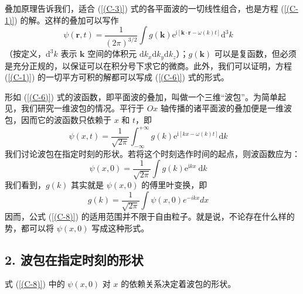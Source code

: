 叠加原理告诉我们，适合 (\ref{(C-3)}) 式的各平面波的一切线性组合，也是方程 (\ref{(C-1)}) 的解。这样的叠加可以写作
\begin{equation}
	\psi(\boldsymbol{r}, t)=\frac{1}{(2\pi)^{3 /2}}\int g(\boldsymbol{k})\mathrm{e}^{\mathrm{i}[\boldsymbol{k}\cdot\boldsymbol{r}-\omega(k) t]}\mathrm{d}^{3} k \quad \label{(C-6)}
\end{equation}
（按定义，$\mathrm{d}^{3}k$ 表示 $\boldsymbol{k}$ 空间的体积元 $\mathrm{d}k_x \mathrm{d}k_y \mathrm{d}k_z$）；$g(\boldsymbol{k})$ 可以是复函数，但必须是充分正规的，以保证可以在积分号下求它的微商。此外，我们可以证明，方程 (\ref{(C-1)}) 的一切平方可积的解都可以写成 (\ref{(C-6)}) 式的形式。

形如 (\ref{(C-6)}) 式的波函数，即平面波的叠加，叫做一个三维“波包”。为简单起见，我们研究一维波包的情况。平行于 $Ox$ 轴传播的诸平面波的叠加便是一维波包，因而它的波函数只依赖于 $x$ 和 $t$，即
\begin{equation}
	\psi (x, t)=\frac{1}{\sqrt{2 \pi}} \int_{-\infty}^{+\infty} g(k) \mathrm{e}^{\mathrm{i}[k x-\omega(k) t]} \mathrm{d} k \quad \label{(C-7)}
\end{equation}
我们讨论波包在指定时刻的形状。若将这个时刻选作时间的起点，则波函数应为：
\begin{equation}
	\psi (x, 0)=\frac{1}{\sqrt{2 \pi}} \int g(k) \mathrm{e}^{\mathrm{i} k x} \mathrm{~d} k \quad \label{(C-8)}
\end{equation}
我们看到，$g(k)$ 其实就是 $\psi (x, 0)$ 的傅里叶变换，即
\begin{equation}
	g(k)=\frac{1}{\sqrt{2\pi}}\int\psi(x, 0)e^{-ikx}dx \quad \label{(C-9)}
\end{equation}
因而，公式 (\ref{(C-8)}) 的适用范围并不限于自由粒子。就是说，不论存在什么样的势，都可以将 $\psi (x, 0)$ 写成这种形式。



\subsection*{2. 波包在指定时刻的形状}
式 (\ref{(C-8)}) 中的 $\psi (x, 0)$ 对 $x$ 的依赖关系决定着波包的形状。

